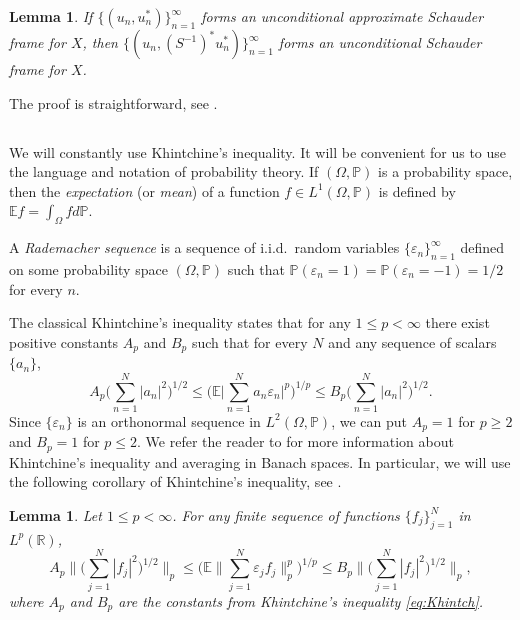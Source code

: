 \documentclass[reqno,a4paper,12pt]{amsart}
\numberwithin{equation}{section}
\numberwithin{figure}{section}
\newcommand\R{\mathbb{R}}
\newcommand\1{\mathds{1}}
\newcommand\eps{\varepsilon}
\newcommand{\PP}{\mathbb{P}}
\newcommand{\E}{\mathbb{E}}
\renewcommand\le{\leqslant}
\renewcommand\ge{\geqslant}
\theoremstyle{plain}
\newtheorem{lem}[thm]{Lemma}
\newtheorem{lemma}[thm]{Lemma}
\theoremstyle{definition}
\begin{document}
\begin{lemma}\label{lem:approxframe}
If $\{(u_n, u_n^*)\}_{n=1}^\infty$ forms an
unconditional approximate Schauder frame for $X$, 
then $\{(u_n, (S^{-1})^* u_n^*)\}_{n=1}^\infty$
forms an unconditional Schauder frame for $X$.
\end{lemma} 
The proof is straightforward, see \cite[Lemma 3.1]{FOSZ14}.

\subsection{}
We will constantly use Khintchine's inequality. It will be convenient for us to use the language and notation of probability theory.  
If $(\Omega, \PP)$ is a probability space, then the \emph{expectation} (or \emph{mean})
of a function $f \in L^1(\Omega, \PP)$ is defined by
$\E f = \int_{\Omega} f d\PP$.

A \emph{Rademacher sequence} is a sequence of i.i.d.\ random variables $\{\eps_n\}_{n=1}^\infty$ defined on some probability space $(\Omega, \PP)$ such that $\PP(\eps_n = 1) = \PP(\eps_n = -1) = 1/2$ for every $n$.

The classical Khintchine's inequality states that for any $1\le p < \infty$ there exist positive constants $A_p$ and $B_p$ such that for every $N$ and any sequence of scalars $\{a_n\}$,
\begin{equation}\label{eq:Khintch}
A_p \Big( \sum_{n=1}^N |a_n|^2 \Big)^{1/2}\le \Big(\E \Big| \sum_{n=1}^N a_n\eps_n \Big|^p\Big)^{1/p} \le B_p\Big( \sum_{n=1}^N |a_n|^2 \Big)^{1/2}.
\end{equation}
Since $\{\eps_n\}$ is an orthonormal sequence in $L^2(\Omega, \PP)$, we can put $A_p = 1$ for $p\ge 2$ and $B_p = 1$ for $p\le 2$. We refer the reader to \cite[Section 6.2]{AK16} for more information about Khintchine's inequality and averaging in Banach spaces. In particular, we will use the following corollary of Khintchine's inequality, see \cite[Theorem 6.2.13]{AK16}.

\begin{lem}\label{lem:squarefunc}
Let $1\le p < \infty$. For any finite sequence of functions $\{f_j\}_{j=1}^N$ in $L^p(\R)$,
\begin{equation}
A_p \Big\| \Big(\sum_{j=1}^N |f_j|^2\Big)^{1/2} \Big\|_p\le \Big( \E \Big\| \sum_{j=1}^N \eps_j f_j \Big\|_p^p \Big)^{1/p}\le B_p \Big\| \Big(\sum_{j=1}^N |f_j|^2\Big)^{1/2} \Big\|_p,
\end{equation}
where $A_p$ and $B_p$ are the constants from Khintchine's inequality \eqref{eq:Khintch}.
\end{lem} 
\end{document}
